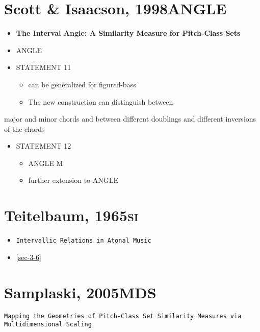 \documentclass[11pt]{article}
\begin{document}
{{\section{Scott \& Isaacson, 1998\hfill{}\textsc{ANGLE}}
\label{sec-13}
\begin{itemize}
\item \textbf{The Interval Angle: A Similarity Measure for Pitch-Class Sets}
\item ANGLE
\item STATEMENT 11
\begin{itemize}
\item can be generalized for figured-bass
\item The new construction can distinguish between
\end{itemize}
\end{itemize}
major and minor chords and between different doublings and different
inversions of the chords
\begin{itemize}
\item STATEMENT 12
\begin{itemize}
\item ANGLE M
\item further extension to ANGLE
\end{itemize}
\end{itemize}

\section{Teitelbaum, 1965\hfill{}\textsc{si}}
\label{sec-14}
\begin{itemize}
\item \texttt{Intervallic Relations in Atonal Music}
\item \ref{sec-3-6}
\end{itemize}

\section{Samplaski, 2005\hfill{}\textsc{MDS}}
\label{sec-15}
\texttt{Mapping the Geometries of Pitch-Class Set Similarity Measures via
Multidimensional Scaling}
}}
\end{document}
